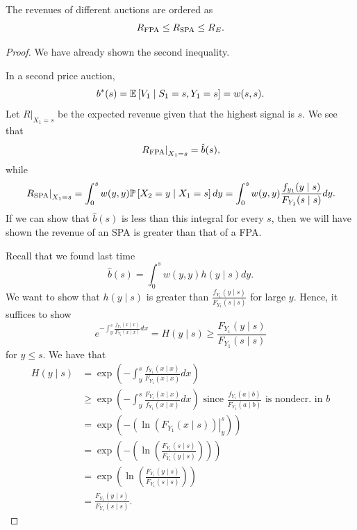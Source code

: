 \begin{proposition}	The revenues of different auctions are ordered as \[
		R_{\text{FPA}} \le R_{\text{SPA}} \le R_E
	.\] 
\end{proposition}

\begin{proof}
	We have already shown the second inequality.

	In a second price auction, \[
		b^*(s) = \mathbb{E}\left[V_1 \mid S_1 = s, Y_1 = s\right] = w(s,s)
	.\] 
	Let $\left. R \right|_{X_1 = s} $ be the expected revenue given that the highest signal is $s$.
	We see that \[
		\left.R_{\text{FPA}}\right|_{X_1 = s} = \hat{b}(s)
	,\] 
	while \[
		\left.R_{\text{SPA}}\right|_{X_1 = s} = \int_0^{s}w(y,y) \mathbb{P}\left[X_2 = y \mid X_1 = s\right] dy= \int_{0}^{s} w(y,y) \frac{f_{y_1}(y\mid s)}{F_{Y_1}(s \mid s)} dy 
	.\] 
	If we can show that $\hat{b}(s)$ is less than this integral for every $s$, then we will have shown the revenue of an SPA is greater than that of a FPA.

	Recall that we found last time \[
		\hat{b}(s) = \int_{0}^{s} w(y,y) h(y\mid s)dy 
	.\] We want to show that $h(y \mid s)$ is greater than $\frac{f_{Y_1}(y\mid s)}{F_{Y_1}(s \mid s)}$ for large $y$.
	Hence, it suffices to show \[
		e^{- \int_{y}^{s} \frac{f_{Y_1}(x \mid x)}{F_{Y_1}(x \mid x)}dx } = H(y \mid s) \ge \frac{F_{Y_1} (y\mid s)}{F_{Y_1} (s \mid s)}
	\] for $y \le s$.
	We have that
	\begin{align*}
		H(y \mid s)
		&= \operatorname{exp}\left( - \int_{y}^{s} \frac{f_{Y_1} (x\mid x)}{F_{Y_1}(x\mid x)}dx \right) \\
		&\ge \operatorname{exp}\left(-\int_{y}^{s} \frac{F_{Y_1}(x\mid x)}{f_{Y_1}(x \mid x)}dx \right) \text{ since } \frac{f_{Y_1}(a \mid b)}{F_{Y_1}(a \mid b)} \text{ is nondecr. in $b$} \\
		&= \operatorname{exp}\left(- \left. \left( \ln{\left(F_{Y_1}(x \mid s)\right)}\right|_{y}^{s} \right)\right) \\
		&= \operatorname{exp}\left(- \left( \ln{\left(\frac{F_{Y_1} (s \mid s)}{F_{Y_1}(y \mid s)}\right)} \right)\right) \\
		&= \operatorname{exp}\left(\ln{\left(\frac{F_{Y_1} (y \mid s)}{F_{Y_1} (s \mid s)}\right)}\right) \\
		&= \frac{F_{Y_1} (y \mid s)}{F_{Y_1} (s \mid s)}
	.\end{align*}
\end{proof}
